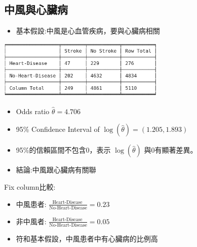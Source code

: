 \subsection{中風與心臟病}
\begin{itemize}
    \item 基本假設:中風是心血管疾病，要與心臟病相關
\end{itemize}
\begin{center}
    \includegraphics[width=8cm]{./two_by_two_table/heartd_stroke.png}
\end{center}
\begin{itemize}
    \item Odds ratio $\hat{\theta}=4.706$
    \item 95\% Confidence Interval of $\log{(\hat{\theta})}=(1.205, 1.893)$
    \item 95\%的信賴區間不包含0，表示 $\log{(\hat{\theta})}$ 與0有顯著差異。
    \item 結論:中風跟心臟病有關聯
\end{itemize}
Fix column比較:
\begin{itemize}
    \item 中風患者: $\frac{\text{Heart-Disease }}{\text{No-Heart-Disease}}=0.23$
    \item 非中風者: $\frac{\text{Heart-Disease }}{\text{No-Heart-Disease}}=0.05$
    \item 符和基本假設，中風患者中有心臟病的比例高
\end{itemize}

